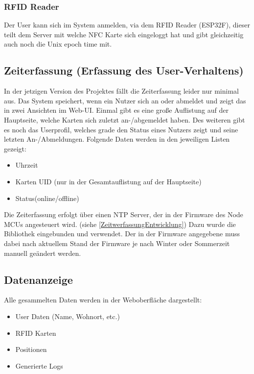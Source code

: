 \documentclass[../main.tex]{subfiles}
\begin{document}
\subsubsection{RFID Reader}

Der User kann sich im System anmelden, via dem RFID Reader (ESP32F), dieser teilt dem Server mit welche NFC Karte sich eingeloggt hat und gibt gleichzeitig auch noch die Unix epoch time mit.

\subsection{Zeiterfassung (Erfassung des User-Verhaltens)} \label{Zeiterfassung}

In der jetzigen Version des Projektes fällt die Zeiterfassung leider nur minimal aus. Das System speichert, wenn ein Nutzer sich an oder abmeldet und zeigt das in zwei Ansichten im Web-UI. Einmal gibt es eine große Auflistung auf der Hauptseite, welche Karten sich zuletzt an-/abgemeldet haben. Des weiteren gibt es noch das Userprofil, welches grade den Status eines Nutzers zeigt und seine letzten An-/Abmeldungen. Folgende Daten werden in den jeweiligen Listen gezeigt:

\begin{itemize}
  \item Uhrzeit
  \item Karten UID (nur in der Gesamtauflistung auf der Hauptseite)
  \item Status(online/offline)
\end{itemize}

\noindent Die Zeiterfassung erfolgt über einen NTP Server, der in der Firmware des Node MCUs angesteuert wird. (siehe \ref{ZeitwerfassungEntwicklung}) Dazu wurde die  Bibliothek eingebunden und verwendet. Der in der Firmware angegebene  muss dabei nach aktuellem Stand der Firmware je nach Winter oder Sommerzeit manuell geändert werden.

\subsection{Datenanzeige}

Alle gesammelten Daten werden in der Weboberfläche dargestellt:

\begin{itemize}
  \item User Daten (Name, Wohnort, etc.)
  \item RFID Karten
  \item Positionen
  \item Generierte Logs
\end{itemize}
\end{document}
